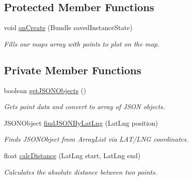 \subsection*{Protected Member Functions}
\begin{DoxyCompactItemize}
\item 
void \hyperlink{classcom_1_1jack_1_1motorbikestatistics_1_1_maps_activity_afd23eb0cf651de276a9b85bb5fa609b8}{on\+Create} (Bundle saved\+Instance\+State)
\begin{DoxyCompactList}\small\item\em Fills our maps array with points to plot on the map. \end{DoxyCompactList}\end{DoxyCompactItemize}
\subsection*{Private Member Functions}
\begin{DoxyCompactItemize}
\item 
boolean \hyperlink{classcom_1_1jack_1_1motorbikestatistics_1_1_maps_activity_a0c72fcb79424420c3477add9ba6ab447}{get\+J\+S\+O\+N\+Objects} ()
\begin{DoxyCompactList}\small\item\em Gets point data and convert to array of J\+S\+ON objects. \end{DoxyCompactList}\item 
J\+S\+O\+N\+Object \hyperlink{classcom_1_1jack_1_1motorbikestatistics_1_1_maps_activity_ae5478e56dfb617433d0dfaeb94a403c7}{find\+J\+S\+O\+N\+By\+Lat\+Lng} (Lat\+Lng position)
\begin{DoxyCompactList}\small\item\em Finds J\+S\+O\+N\+Object from Array\+List via L\+A\+T/\+L\+NG coordinates. \end{DoxyCompactList}\item 
float \hyperlink{classcom_1_1jack_1_1motorbikestatistics_1_1_maps_activity_af4feb7617c02a59c62d6e9257914e997}{calc\+Distance} (Lat\+Lng start, Lat\+Lng end)
\begin{DoxyCompactList}\small\item\em Calculates the absolute distance between two points. \end{DoxyCompactList}\end{DoxyCompactItemize}
